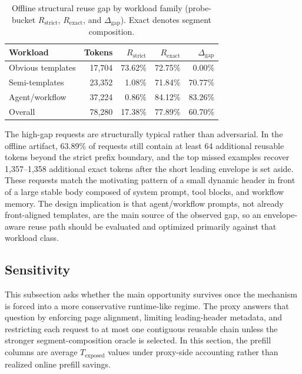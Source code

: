 \documentclass[conference]{IEEEtran}
\begin{document}
\begin{table}[t]
\caption{Offline structural reuse gap by workload family (probe-bucket $R_{\text{strict}}$, $R_{\text{exact}}$, and $\Delta_{\text{gap}}$). Exact denotes segment composition.}
\label{tab:prefix-gap}
\centering
\footnotesize
\setlength{\tabcolsep}{3pt}
\begin{tabular}{@{}lrrrr@{}}
\toprule
Workload & Tokens & $R_{\text{strict}}$ & $R_{\text{exact}}$ & $\Delta_{\text{gap}}$ \\
\midrule
Obvious templates & 17{,}704 & 73.62\% & 72.75\% & 0.00\% \\
Semi-templates & 23{,}352 & 1.08\% & 71.84\% & 70.77\% \\
Agent/workflow & 37{,}224 & 0.86\% & 84.12\% & 83.26\% \\
Overall & 78{,}280 & 17.38\% & 77.89\% & 60.70\% \\
\bottomrule
\end{tabular}
\end{table}

The high-gap requests are structurally typical rather than adversarial. In the offline artifact, 63.89\% of requests still contain at least 64 additional reusable tokens beyond the strict prefix boundary, and the top missed examples recover 1{,}357--1{,}358 additional exact tokens after the short leading envelope is set aside. These requests match the motivating pattern of a small dynamic header in front of a large stable body composed of system prompt, tool blocks, and workflow memory. The design implication is that agent/workflow prompts, not already front-aligned templates, are the main source of the observed gap, so an envelope-aware reuse path should be evaluated and optimized primarily against that workload class.

\subsection{Sensitivity}

This subsection asks whether the main opportunity survives once the mechanism is forced into a more conservative runtime-like regime. The proxy answers that question by enforcing page alignment, limiting leading-header metadata, and restricting each request to at most one contiguous reusable chain unless the stronger segment-composition oracle is selected. In this section, the prefill columns are average $T_{\text{exposed}}$ values under proxy-side accounting rather than realized online prefill savings.
\end{document}
